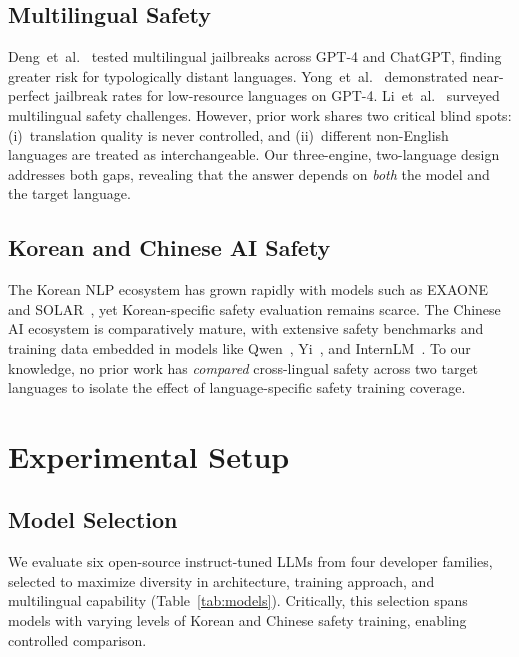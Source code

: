 \documentclass[AMS,STIX2COL]{WileyNJD-v2}
\begin{document}
\subsection{Multilingual Safety}

Deng~et~al.~\cite{deng2024multilingual} tested multilingual jailbreaks
across GPT-4 and ChatGPT, finding greater risk for typologically distant
languages.
Yong~et~al.~\cite{yong2024lowresource} demonstrated near-perfect
jailbreak rates for low-resource languages on GPT-4.
Li~et~al.~\cite{li2024cross} surveyed multilingual safety challenges.
However, prior work shares two critical blind spots: (i)~translation
quality is never controlled, and (ii)~different non-English languages are
treated as interchangeable.
Our three-engine, two-language design addresses both gaps, revealing that
the answer depends on \emph{both} the model and the target language.

\subsection{Korean and Chinese AI Safety}

The Korean NLP ecosystem has grown rapidly with models such as
EXAONE~\cite{exaone2024} and SOLAR~\cite{kim2024solar}, yet
Korean-specific safety evaluation remains scarce.
The Chinese AI ecosystem is comparatively mature, with extensive
safety benchmarks and training data embedded in models like
Qwen~\cite{qwen2024qwen25}, Yi~\cite{yi2024}, and
InternLM~\cite{internlm2024}.
To our knowledge, no prior work has \emph{compared} cross-lingual
safety across two target languages to isolate the effect of
language-specific safety training coverage.

\section{Experimental Setup}
\label{sec:setup}

\subsection{Model Selection}
\label{sec:models}

We evaluate six open-source instruct-tuned LLMs from four developer
families, selected to maximize diversity in architecture, training
approach, and multilingual capability (Table~\ref{tab:models}).
Critically, this selection spans models with varying levels of
Korean and Chinese safety training, enabling controlled comparison.
\end{document}
